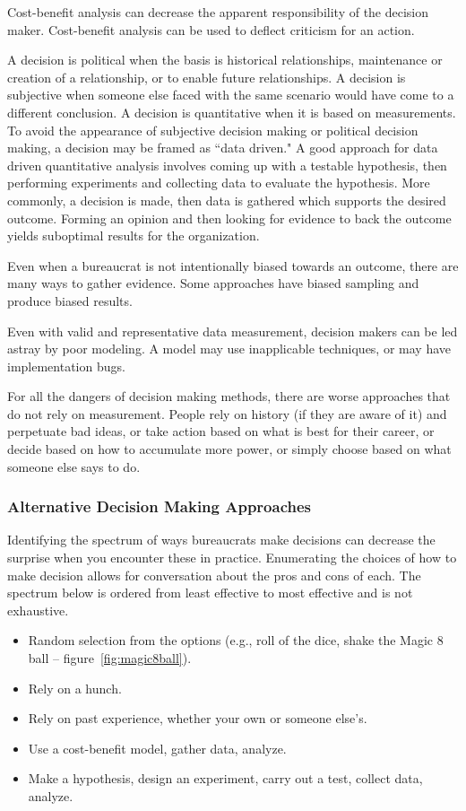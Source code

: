 Cost-benefit analysis can decrease the apparent responsibility of the decision maker. Cost-benefit analysis can be used to deflect criticism for an action. 

A decision is political when the basis is historical relationships, maintenance or creation of a relationship, or to enable future relationships. A decision is subjective when someone else faced with the same scenario would have come to a different conclusion.
A decision is quantitative when it is based on measurements. To avoid the appearance of subjective decision making or political decision making, a decision may be framed as ``data driven." 
A good approach for data driven quantitative analysis involves coming up with a testable hypothesis, then performing experiments and collecting data to evaluate the hypothesis. More commonly, a decision is made, then data is gathered which supports the desired outcome. Forming an opinion and then looking for evidence to back the outcome yields suboptimal results for the organization.

Even when a bureaucrat is not intentionally biased towards an outcome, there are many ways to gather evidence. Some approaches have biased sampling and produce biased results.

Even with valid and representative data measurement, decision makers can be led astray by poor modeling. A model may use inapplicable techniques, or may have implementation bugs.

For all the dangers of decision making methods, there are worse approaches that do not rely on measurement. People rely on history (if they are aware of it) and perpetuate bad ideas, or take action based on what is best for their career, or decide based on how to accumulate more power, or simply choose based on what someone else says to do.  

\subsubsection{Alternative Decision Making Approaches}
Identifying the spectrum of ways bureaucrats make decisions can decrease the surprise when you encounter these in practice. Enumerating the choices of how to make decision allows for conversation about the pros and cons of each. The spectrum below is ordered from least effective to most effective and is not exhaustive.
\begin{itemize}
    \item Random selection from the options (e.g., roll of the dice, shake the Magic 8 ball -- figure~\ref{fig:magic8ball}).
    \item Rely on a hunch.
    \item Rely on past experience, whether your own or someone else's.
    \item Use a cost-benefit model, gather data, analyze.
    \item Make a hypothesis, design an experiment, carry out a test, collect data, analyze.
\end{itemize}

